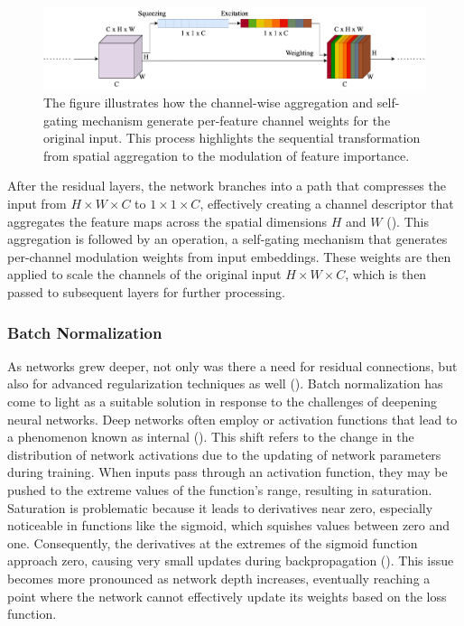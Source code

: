         \bigskip
        
        \begin{figure}[htbp]
            \centering
            \includegraphics[width=0.9\linewidth]{images/methods_mono/se_block/se_layer.png}
            \captionsetup{justification=justified, singlelinecheck=false, width=1\linewidth, labelfont=bf} 
            \caption[]{The figure illustrates how the channel-wise aggregation and self-gating mechanism generate per-feature channel weights for the original input. This process highlights the sequential transformation from spatial aggregation to the modulation of feature importance.}
            \label{fig:seop}
        \end{figure}
        
        \noindent After the residual layers, the network branches into a path that compresses the input from $H\times W\times C$ to $1\times 1\times C$, effectively creating a channel descriptor that aggregates the feature maps across the spatial dimensions $H$ and $W$ (\textcolor{deepblue}{\cite{hu2017squeezeandexcitation}}). This aggregation is followed by an operation, a self-gating mechanism that generates per-channel modulation weights from input embeddings. These weights are then applied to scale the channels of the original input $H\times W\times C$, which is then passed to subsequent layers for further processing.

    \subsubsection{Batch Normalization} \label{subsec:batchnorm}

        \noindent As networks grew deeper, not only was there a need for residual connections, but also for advanced regularization techniques as well (\cite{TIAN2022146}). Batch normalization has come to light as a suitable solution in response to the challenges of deepening neural networks. Deep networks often employ or activation functions that lead to a phenomenon known as internal (\cite{ioffe2015batch}). This shift refers to the change in the distribution of network activations due to the updating of network parameters during training. When inputs pass through an activation function, they may be pushed to the extreme values of the function’s range, resulting in saturation. Saturation is problematic because it leads to derivatives near zero, especially noticeable in functions like the sigmoid, which squishes values between zero and one. Consequently, the derivatives at the extremes of the sigmoid function approach zero, causing very small updates during backpropagation (\cite{7376778}). This issue becomes more pronounced as network depth increases, eventually reaching a point where the network cannot effectively update its weights based on the loss function.
        
